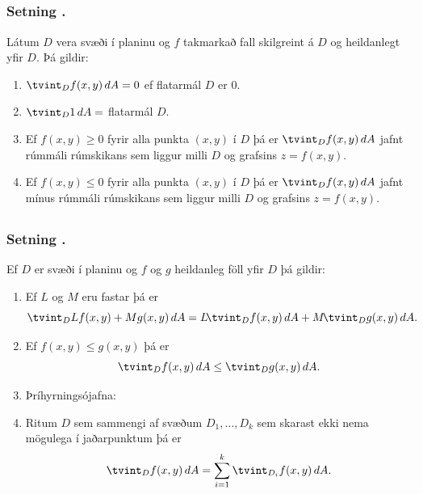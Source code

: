 \subsection{} 

\subsubsection{Setning \kaflanr.}
Látum $D$ vera svæði í planinu og $f$ takmarkað
fall skilgreint á $D$ og heildanlegt yfir $D$.  Þá gildir:

\begin {enumerate}
 \item $\tvint_D f(x,y)\,dA=0$ ef flatarmál $D$ er 0.
 \item $\tvint_D 1\,dA=$ flatarmál $D$.
 \item Ef $f(x,y)\geq 0$ fyrir alla punkta $(x,y)$ í $D$ þá er 
$\tvint_D f(x,y)\,dA$ jafnt rúmmáli rúmskikans sem liggur milli $D$ og
grafsins $z=f(x,y)$.
\item Ef $f(x,y)\leq 0$ fyrir alla punkta $(x,y)$ í $D$ þá er 
$\tvint_D f(x,y)\,dA$ jafnt mínus rúmmáli rúmskikans sem liggur milli $D$ og
grafsins $z=f(x,y)$.
\end {enumerate}






\subsection{} 

\subsubsection{Setning \kaflanr.}
Ef $D$ er svæði í planinu og $f$ og $g$
heildanleg föll yfir $D$ þá gildir:

\begin {enumerate}
 \item  Ef $L$ og $M$ eru fastar þá er
$$\tvint_D Lf(x,y)+Mg(x,y)\,dA=L\!\tvint_D f(x,y)\,dA+M\!\tvint_D
g(x,y)\,dA.$$
\item  Ef $f(x,y)\leq g(x,y)$ þá er 
$$\tvint_D f(x,y)\,dA\leq \tvint_Dg(x,y)\,dA.$$

\item  Þríhyrningsójafna: 

\item  Ritum $D$ sem sammengi af svæðum $D_1,\ldots, D_k$ sem skarast
ekki nema mögulega í jaðarpunktum þá er
$$\tvint_D f(x,y)\,dA=\sum_{i=1}^k\tvint_{D_i}f(x,y)\,dA.$$
\end {enumerate}






